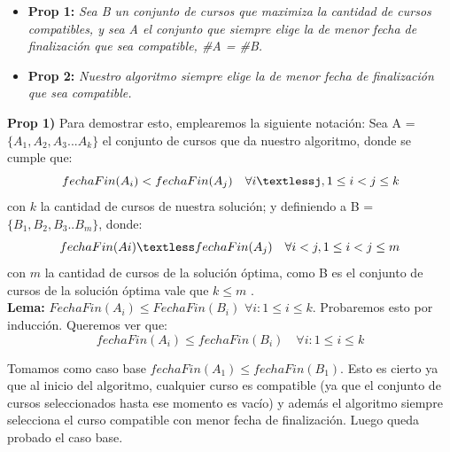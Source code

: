 \begin{itemize}
\item \textbf{Prop 1: }\emph{Sea B un conjunto de cursos que maximiza la cantidad de cursos compatibles, y sea A el conjunto que siempre elige la de menor fecha de finalizaci\'on que sea compatible, \#A = \#B.}
\item \textbf{Prop 2: }\emph{Nuestro algoritmo siempre elige la de menor fecha de finalizaci\'on que sea compatible.}\\
\end{itemize}


\textbf{Prop 1)} Para demostrar esto, emplearemos la siguiente notaci\'on: Sea A = $\{A_1,A_2,A_3...A_k\}$ el conjunto de cursos que da nuestro algoritmo, donde se cumple que:
\begin{equation}
fechaFin(A_i)<fechaFin(A_j) \quad \forall i\textlessj ,1\le i<j\le k\\
\end{equation}
con $k$ la cantidad de cursos de nuestra soluci\'on; y definiendo a B = $\{B_1,B_2,B_3..B_m\}$, donde:\\
\begin{equation}
fechaFin(Ai)\textless fechaFin(A_j) \quad \forall i<j, 1\le i<j\le m\\ 
\end{equation}
con $m$ la cantidad de cursos de la soluci\'on \'optima, como B es el conjunto de cursos de la soluci\'on \'optima vale que $k\le m$ .\\

\textbf{Lema:} $FechaFin(A_i) \le FechaFin(B_i)$ $\forall i: 1\le i \le k$. Probaremos esto por inducción. Queremos ver que:
\begin{equation}
	fechaFin(A_i)\leq fechaFin(B_i) \quad \forall i: 1\le i \le k 
\end{equation}

Tomamos como caso base $fechaFin(A_1)\leq fechaFin(B_1)$. Esto es cierto ya que al inicio del algoritmo, cualquier curso es compatible (ya que el conjunto de cursos seleccionados hasta ese momento es vac\'io) y adem\'as el algoritmo siempre selecciona el curso compatible con menor fecha de finalizaci\'on. Luego queda probado el caso base.\\

